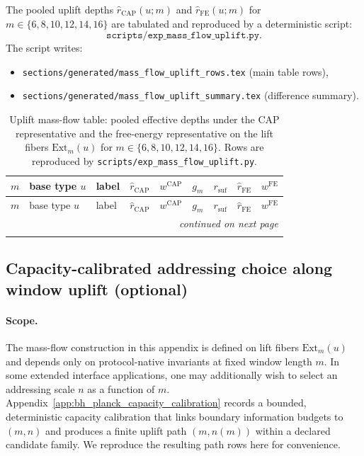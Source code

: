 \AuditTag The pooled uplift depths $\widehat r_{\mathrm{CAP}}(u;m)$ and $\widehat r_{\mathrm{FE}}(u;m)$
for $m\in\{6,8,10,12,14,16\}$ are tabulated and reproduced by a deterministic script:
\[
\texttt{scripts/exp\_mass\_flow\_uplift.py}.
\]
The script writes:
\begin{itemize}
\item \texttt{sections/generated/mass\_flow\_uplift\_rows.tex} (main table rows),
\item \texttt{sections/generated/mass\_flow\_uplift\_summary.tex} (difference summary).
\end{itemize}
\vspace{0.5em}
\begingroup
\scriptsize
\setlength{\tabcolsep}{5pt}
\renewcommand{\arraystretch}{1.15}
\begin{longtable}{rllrrrrrr}
\caption{Uplift mass-flow table: pooled effective depths under the CAP representative and the free-energy representative on the lift fibers $\mathrm{Ext}_m(u)$ for $m\in\{6,8,10,12,14,16\}$. Rows are reproduced by \texttt{scripts/exp\_mass\_flow\_uplift.py}.}\label{tab:mass_flow_uplift}\\
\toprule
$m$ & base type $u$ & label &
$\widehat r_{\mathrm{CAP}}$ & $w^{\mathrm{CAP}}$ & $g_m$ & $r_{\mathrm{suf}}$ &
$\widehat r_{\mathrm{FE}}$ & $w^{\mathrm{FE}}$ \\
\midrule
\endfirsthead
\toprule
$m$ & base type $u$ & label &
$\widehat r_{\mathrm{CAP}}$ & $w^{\mathrm{CAP}}$ & $g_m$ & $r_{\mathrm{suf}}$ &
$\widehat r_{\mathrm{FE}}$ & $w^{\mathrm{FE}}$ \\
\midrule
\endhead
\midrule
\multicolumn{9}{r}{\emph{continued on next page}}\\
\endfoot
\bottomrule
\endlastfoot
%
\end{longtable}
\endgroup

\subsection{Capacity-calibrated addressing choice along window uplift (optional)}
\label{subsec:mass_flow_capacity_calibrated_path}

\paragraph{Scope.}
\AuditTag The mass-flow construction in this appendix is defined on lift fibers $\mathrm{Ext}_m(u)$ and depends only on protocol-native invariants at fixed window length $m$.
In some extended interface applications, one may additionally wish to select an addressing scale $n$ as a function of $m$.
Appendix~\ref{app:bh_planck_capacity_calibration} records a bounded, deterministic capacity calibration that links boundary information budgets to $(m,n)$ and produces a finite uplift path $(m,n(m))$ within a declared candidate family.
We reproduce the resulting path rows here for convenience.

